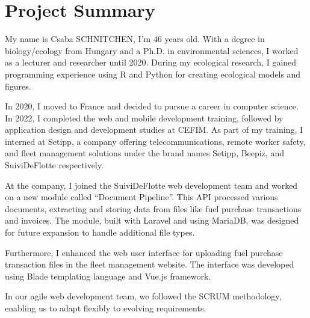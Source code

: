 \chapter{Project Summary}\label{ch:project-summary}


My name is Csaba SCHNITCHEN, I'm 46 years old. With a degree in biology/ecology from Hungary and a Ph.D. in environmental sciences, I worked as a lecturer and researcher until 2020. During my ecological research, I gained programming experience using R and Python for creating ecological models and figures.

In 2020, I moved to France and decided to pursue a career in computer science. In 2022, I completed the web and mobile development training, followed by application design and development studies at CEFIM. As part of my training, I interned at Setipp, a company offering telecommunications, remote worker safety, and fleet management solutions under the brand names Setipp, Beepiz, and SuiviDeFlotte respectively.

At the company, I joined the SuiviDeFlotte web development team and worked on a new module called \foreignquote{french}{Document Pipeline}. This API processed various documents, extracting and storing data from files like fuel purchase transactions and invoices. The module, built with Laravel and using MariaDB, was designed for future expansion to handle additional file types.

Furthermore, I enhanced the web user interface for uploading fuel purchase transaction files in the fleet management website. The interface was developed using Blade templating language and Vue.js framework.

In our agile web development team, we followed the SCRUM methodology, enabling us to adapt flexibly to evolving requirements.